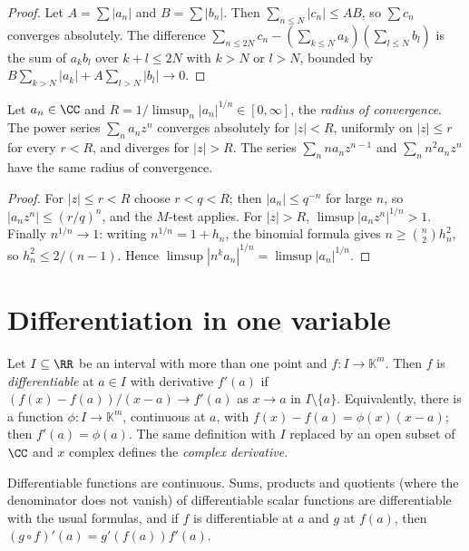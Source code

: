 \begin{proof}
Let $A = \sum|a_n|$ and $B = \sum|b_n|$. Then $\sum_{n \leq N}|c_n| \leq AB$, so $\sum c_n$ converges absolutely. The difference $\sum_{n \leq 2N}c_n - (\sum_{k \leq N}a_k)(\sum_{l \leq N}b_l)$ is the sum
of $a_kb_l$ over $k + l \leq 2N$ with $k > N$ or $l > N$, bounded by $B\sum_{k > N}|a_k| + A\sum_{l > N}|b_l| \to 0$.
\end{proof}

\begin{theorem}\label{real-analysis:theorem-power-series}
Let $a_n \in \CC$ and $R = 1/\limsup_n|a_n|^{1/n} \in [0, \infty]$, the \emph{radius of convergence}. The power series $\sum_n a_nz^n$ converges absolutely for $|z| < R$, uniformly on
$|z| \leq r$ for every $r < R$, and diverges for $|z| > R$. The series $\sum_n na_nz^{n-1}$ and $\sum_n n^2a_nz^n$ have the same radius of convergence.
\end{theorem}

\begin{proof}
For $|z| \leq r < R$ choose $r < q < R$; then $|a_n| \leq q^{-n}$ for large $n$, so $|a_nz^n| \leq (r/q)^n$, and the $M$-test applies. For $|z| > R$, $\limsup|a_nz^n|^{1/n} > 1$. Finally
$n^{1/n} \to 1$: writing $n^{1/n} = 1 + h_n$, the binomial formula gives $n \geq \binom{n}{2}h_n^2$, so $h_n^2 \leq 2/(n-1)$. Hence $\limsup|n^ka_n|^{1/n} = \limsup|a_n|^{1/n}$.
\end{proof}

\section{Differentiation in one variable}\label{real-analysis:section-one-variable}

\begin{definition}\label{real-analysis:definition-derivative-one}
Let $I \subseteq \RR$ be an interval with more than one point and $f \colon I \to \mathbb{K}^m$. Then $f$ is \emph{differentiable} at $a \in I$ with derivative $f'(a)$ if
$(f(x) - f(a))/(x - a) \to f'(a)$ as $x \to a$ in $I \setminus \{a\}$. Equivalently, there is a function $\phi \colon I \to \mathbb{K}^m$, continuous at $a$, with $f(x) - f(a) = \phi(x)(x - a)$;
then $f'(a) = \phi(a)$. The same definition with $I$ replaced by an open subset of $\CC$ and $x$ complex defines the \emph{complex derivative}.
\end{definition}

\begin{proposition}\label{real-analysis:proposition-derivative-rules}
Differentiable functions are continuous. Sums, products and quotients (where the denominator does not vanish) of differentiable scalar functions are differentiable with the usual
formulas, and if $f$ is differentiable at $a$ and $g$ at $f(a)$, then $(g \circ f)'(a) = g'(f(a))f'(a)$.
\end{proposition}

